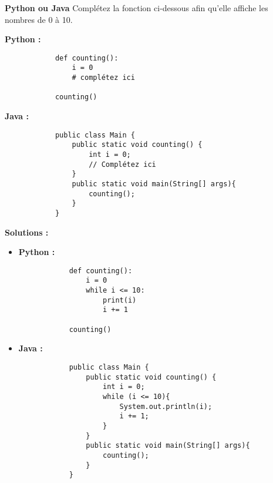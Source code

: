 \begin{Exercice}[5 minutes] \textbf{Python ou Java}
    Complétez la fonction ci-dessous afin qu'elle affiche les nombres de 0 à 10.
    
    \textbf{Python :}
        \begin{verbatim}
            def counting():
                i = 0
                # complétez ici
            
            counting()
        \end{verbatim}
    
    \textbf{Java :}
        \begin{verbatim}
            public class Main {
                public static void counting() {
                    int i = 0;
                    // Complétez ici
                }
                public static void main(String[] args){
                    counting();
                }
            }
        \end{verbatim}
    
    \begin{conseil}
        
    \end{conseil}
    \textbf{Solutions :}
    \begin{itemize}
        \item \textbf{Python :}
        \begin{verbatim}
            def counting():
                i = 0
                while i <= 10:
                    print(i)
                    i += 1
            
            counting()
        \end{verbatim}
        
        \item \textbf{Java :}
        \begin{verbatim}
            public class Main {
                public static void counting() {
                    int i = 0;
                    while (i <= 10){
                        System.out.println(i);
                        i += 1;
                    }
                }
                public static void main(String[] args){
                    counting();
                }
            }
        \end{verbatim}
    \end{itemize}

\end{Exercice}

\newpage


